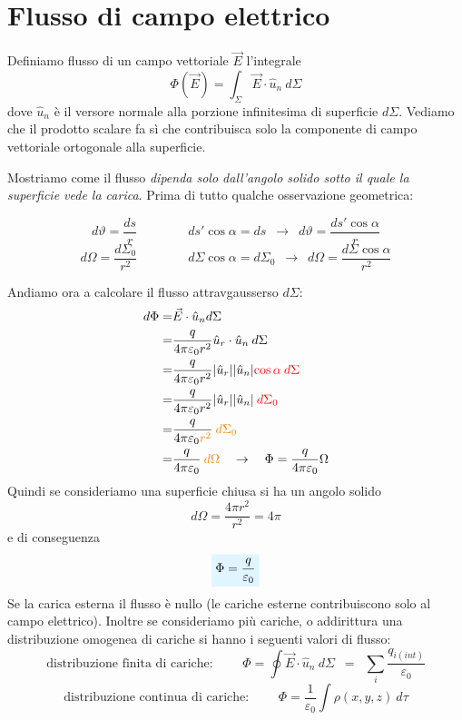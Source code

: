 \documentclass[x11names]{report}
\begin{document}
\section{Flusso di campo elettrico}
Definiamo flusso di un campo vettoriale \(\vec{E}\) l'integrale
\[
\Phi (\vec{E}) = \int_{\Sigma} \vec{E}\cdot \hat{u}_n \: d\Sigma
\]
dove \(\hat{u}_n\) è il versore normale alla porzione infinitesima di superficie \(d\Sigma\). Vediamo che il prodotto scalare fa sì che contribuisca solo la componente di campo vettoriale ortogonale alla superficie. 

\begin{figure}[h]
	\centering
\end{figure}

Mostriamo come il flusso \textit{dipenda solo dall'angolo solido sotto il quale la superficie vede la carica}. Prima di tutto qualche osservazione geometrica:

\[
d\vartheta = \frac{ds}{r} \qquad \qquad ds' \cos\alpha = ds \;\ \to \;\ d\vartheta = \frac{ds'\cos\alpha}{r}
\]
\[
d\Omega= \frac{d\Sigma_0}{r^2} \qquad \qquad d\Sigma \cos\alpha = d\Sigma_0 \;\ \to \;\ d\Omega = \frac{d\Sigma\cos\alpha}{r^2}
\]

\begin{figure}[h]
	\centering
\end{figure}


Andiamo ora a calcolare il flusso attravgausserso \(d\Sigma\):
\begin{align*}
	d\Phi =& \vec{E} \cdot \hat{u}_n d\Sigma \\ 
		  =& \frac{q}{4\pi\varepsilon_0 r^2} \hat{u}_r \cdot \hat{u}_n \: d\Sigma \\
		  =& \frac{q}{4\pi\varepsilon_0 r^2} |\hat{u}_r||\hat{u}_n|\textcolor{red}{\cos\alpha\: d\Sigma} \\ 
		  =& \frac{q}{4\pi\varepsilon_0 r^2} |\hat{u}_r||\hat{u}_n|\textcolor{red}{\: d\Sigma_0} \\
		  =& \frac{q}{4\pi\varepsilon_0  \textcolor{orange}{r^2}} \textcolor{orange}{\: d\Sigma_0} \\
		  =& \frac{q}{4\pi\varepsilon_0}\: \textcolor{orange}{d\Omega} \quad \to \quad \Phi = \frac{q}{4\pi\varepsilon_0}\Omega
\end{align*}
Quindi se consideriamo una superficie chiusa si ha un angolo solido 
\[
d\Omega = \frac{4\pi r^2}{r^2} = 4\pi
\]
e di conseguenza
\begin{equation}
	\viola{\Phi = \frac{q}{\varepsilon_0}}
\end{equation}
Se la carica esterna il flusso è nullo (le cariche esterne contribuiscono solo al campo elettrico). Inoltre se consideriamo più cariche, o addirittura una distribuzione omogenea di cariche si hanno i seguenti valori di flusso:
\[
\text{distribuzione finita di cariche: }\qquad \Phi = \oint \vec{E} \cdot \hat{u}_n \: d\Sigma \;\ = \;\ \sum_i \frac{q_{i(int)}}{\varepsilon_0}
\]
\[
\text{distribuzione continua di cariche: }\qquad \Phi = \frac{1}{\varepsilon_0}\int \rho(x,y,z) \:d\tau 
\]
\end{document}
